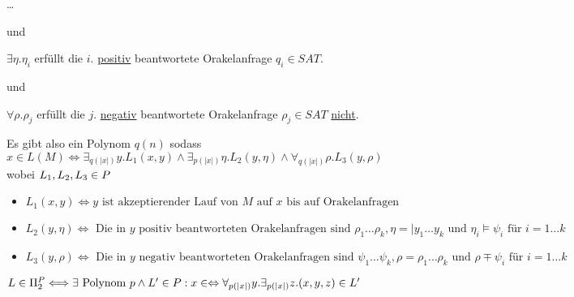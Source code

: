 \begin{beweis}
\begin{itemize}
            \dots 

            und

            $\exists \eta . \eta_i$ erfüllt die $i.$ \underline{positiv} beantwortete Orakelanfrage $q_i \in SAT$.

            und

            $\forall \rho . \rho_j$ erfüllt die $j.$ \underline{negativ} beantwortete Orakelanfrage $\rho_j \in SAT$ \underline{nicht}.

            Es gibt also ein Polynom $q(n)$ sodass $x \in L(M) \Leftrightarrow \exists_{q(|x|)} y . L_1(x,y) \land \exists_{p(|x|)} \eta . L_2(y,\eta) \land \forall_{q(|x|)} \rho . L_3(y, \rho)$ \\
            wobei $L_1, L_2, L_3 \in P$

            \begin{itemize}
                \item 
                    $L_1(x,y) \Longleftrightarrow y \text{ ist akzeptierender Lauf von } M \text{ auf } x \text{ bis auf Orakelanfragen}$

                \item 
                    $L_2(y,\eta) \Longleftrightarrow  \text{ Die in } y \text{ positiv beantworteten Orakelanfragen sind } \rho_1 \dots \rho_k, \eta =| y_1 \dots y_k \text{ und } \eta_i \vDash \psi_i \text{ für } i = 1 \dots k$

                \item 
                    $L_3(y, \rho) \Longleftrightarrow \text{ Die in } y \text{ negativ beantworteten Orakelanfragen sind } \psi_1 \dots \psi_k, \rho = \rho_1 \dots \rho_k \text{ und } \rho \mp \psi_i \text{ für } i = 1 \dots k$

            \end{itemize}

    \end{itemize}

\end{beweis}



\begin{korollar}
    
    $L \in \Pi_2^{P} \Longleftrightarrow \\
    \exists \text{ Polynom } p \land L' \in P: x \in \Leftrightarrow \forall_{p(|x|)} y . \exists_{p(|x|)} z . (x,y,z) \in L'$ 

\end{korollar}


